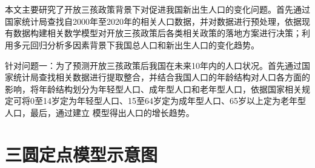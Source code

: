 

\nocite{*}      %




\appendix
\section{}

本文主要研究了开放三孩政策背景下对促进我国新出生人口的变化问题。首先通过国家统计局查找自2000年至2020年的相关人口数据，并对数据进行预处理，依据现有数据构建相关数学模型对开放三孩政策后各类相关政策的落地方案进行决策；利用多元回归分析多因素背景下我国总人口和新出生人口的变化趋势。

针对问题一：为了预测开放三孩政策后我国在未来10年内的人口状况。首先通过国家统计局查找相关数据进行提取整合，并结合我国人口的年龄结构对人口各方面的影响，将年龄结构划分为年轻型人口、成年型人口和老年型人口，依据国家相关规定可将0至14岁定为年轻型人口、15至64岁定为成年型人口、65岁以上定为老年型人口，最后，通过建立 模型得出人口的增长趋势。

\section{三圆定点模型示意图}

